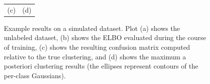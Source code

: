 \documentclass[11pt]{article}
\begin{document}
\begin{figure}[!ht]
\begin{tabular}{cc}
(c) & (d)
\end{tabular}
\caption{Example results on a simulated dataset.
Plot (a) shows the unlabeled dataset,
(b) shows the ELBO evaluated during the course of training,
(c) shows the resulting confusion matrix computed relative to the true clustering,
and (d) shows the maximum a posteriori clustering results (the ellipses represent contours of the per-class Gaussians).}
\label{fig:resultsExample}
\end{figure}
\end{document}
